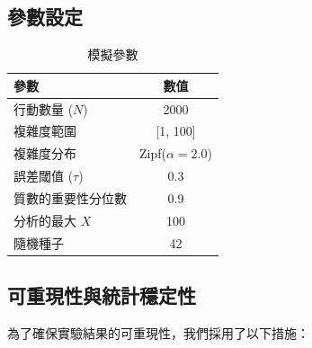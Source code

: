 \documentclass[12pt,a4paper]{article}
\theoremstyle{definition}
\theoremstyle{remark}
\begin{document}
\subsection{參數設定}

\begin{table}[htbp]
\centering
\caption{模擬參數}
\label{tab:parameters}
\begin{tabular}{lc}
\toprule
\textbf{參數} & \textbf{數值} \\
\midrule
行動數量 ($N$) & 2000 \\
複雜度範圍 & [1, 100] \\
複雜度分布 & Zipf($\alpha=2.0$) \\
誤差閾值 ($\tau$) & 0.3 \\
質數的重要性分位數 & 0.9 \\
分析的最大 $X$ & 100 \\
隨機種子 & 42 \\
\bottomrule
\end{tabular}
\end{table}

\subsection{可重現性與統計穩定性}

為了確保實驗結果的可重現性，我們採用了以下措施：
\end{document}
